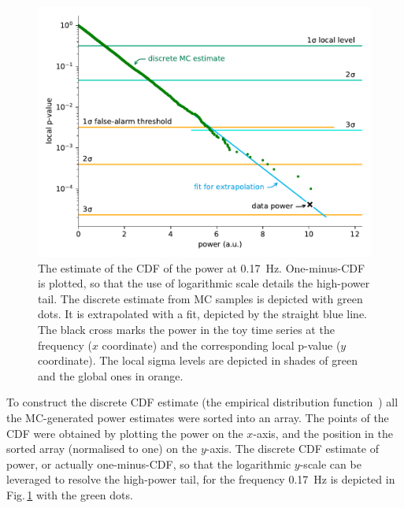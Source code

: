 \begin{figure}
  \centering
  \includegraphics[width=\linewidth]{gfx/axions/MC_estimation_local.pdf}
  \caption{The estimate of the CDF of the power at \SI{0.17}{\hertz}.
  One-minus-CDF is plotted, so that the use of logarithmic scale details the high-power tail.
  The discrete estimate from MC samples is depicted with green dots.
  It is extrapolated with a fit, depicted by the straight blue line.
  The black cross marks the power in the toy time series at the frequency ($x$ coordinate) and the corresponding local p-value ($y$ coordinate).
  The local sigma levels are depicted in shades of green and the global ones in orange.}\label{fig:P_best_signal_candidate}
\end{figure}

To construct the discrete CDF estimate (the empirical distribution function~\cite{tucker1959}) all the MC-generated power estimates were sorted into an array.
The points of the CDF were obtained by plotting the power on the $x$-axis, and the position in the sorted array (normalised to one) on the $y$-axis.
The discrete CDF estimate of power, or actually one-minus-CDF, so that the logarithmic $y$-scale can be leveraged to resolve the high-power tail, for the frequency \SI{0.17}{\hertz} is depicted in Fig.\,\ref{fig:P_best_signal_candidate} with the green dots.

